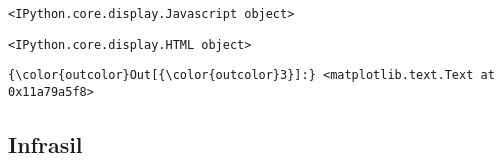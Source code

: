 \documentclass[11pt]{article}
\begin{document}
    
    \begin{verbatim}
<IPython.core.display.Javascript object>
    \end{verbatim}

    
    
    \begin{verbatim}
<IPython.core.display.HTML object>
    \end{verbatim}

    
\begin{Verbatim}[commandchars=\\\{\}]
{\color{outcolor}Out[{\color{outcolor}3}]:} <matplotlib.text.Text at 0x11a79a5f8>
\end{Verbatim}
            
    \subsection{Infrasil}\label{infrasil}
\end{document}
